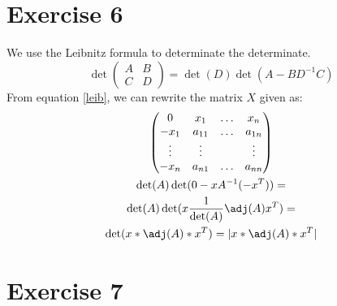 \section{Exercise 6}
We use the Leibnitz formula to determinate the determinate.
\begin{equation}
\label{leib}
\det\begin{pmatrix}A& B\\ C& D\end{pmatrix} = \det(D) \det(A - B D^{-1} C)
\end{equation}
From equation \ref{leib}, we can rewrite the matrix $X$ given as:
\begin{gather*}
\begin{pmatrix}
0& x_1 & \hdots & x_n \\
-x_1 & a_{11} & \hdots & a_{1n}\\
\vdots & \vdots	& & \vdots\\
-x_n & a_{n1} & \hdots & a_{nn} 
\end{pmatrix}  \\
\det(A) \det(0 - x A^{-1} (-x^T)) =\\
\det(A) \det( x \frac{1}{\det(A)} \adj(A) x^T) =\\
\det(x*\adj(A)*x^{T}) = | x*\adj(A)*x^{T} |
\end{gather*}

\section{Exercise 7}
